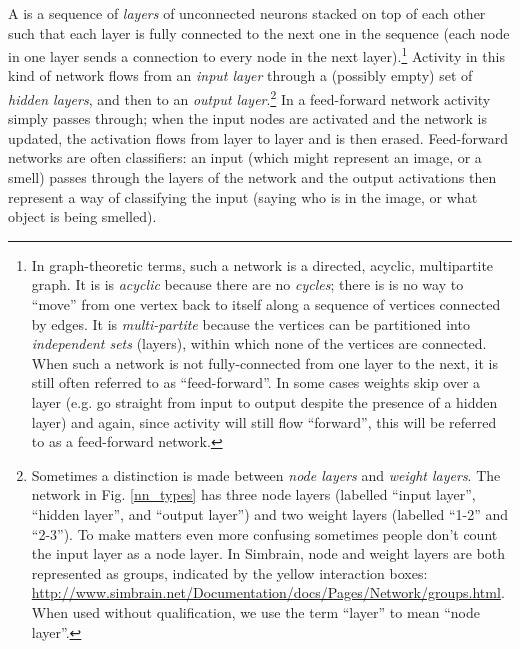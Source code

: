 A   is a sequence of \emph{layers} of unconnected neurons stacked on top of each other such that each layer is fully connected to the next one in the sequence (each node in one layer sends a connection to every node in the next layer).\footnote{\label{acyclic} In graph-theoretic terms, such a network is a directed, acyclic, multipartite graph. It is is \emph{acyclic} because there are no \emph{cycles}; there is is no way to ``move'' from one vertex back to itself along a sequence of vertices connected by edges. It is \emph{multi-partite} because the vertices can be partitioned into \emph{independent sets} (layers), within which none of the vertices are connected. When such a network is not fully-connected from one layer to the next, it is still often referred to as ``feed-forward''. In some cases weights skip over a layer (e.g. go straight from input to output despite the presence of a hidden layer) and again, since activity will still flow ``forward'', this will be referred to as a feed-forward network.}  Activity in this kind of network flows from an \emph{input layer} through a (possibly empty) set of \emph{hidden layers}, and then to an \emph{output layer}.\footnote{Sometimes a distinction is made between \emph{node layers} and \emph{weight layers}. The network in Fig. \ref{nn_types} has three node layers (labelled ``input layer'', ``hidden layer'', and ``output layer'') and two weight layers (labelled ``1-2'' and ``2-3''). To make matters even more confusing sometimes people don't count the input layer as a node layer. In Simbrain, node and weight layers are both represented as groups, indicated by the yellow interaction boxes: \url{http://www.simbrain.net/Documentation/docs/Pages/Network/groups.html}. When used without qualification, we use the term ``layer'' to mean ``node layer''.}   In a feed-forward network activity  simply passes through; when the input nodes are activated and the network is updated, the activation flows from layer to layer and is then erased. Feed-forward networks are often classifiers: an input (which might represent an image, or a smell) passes through the layers of the network and the output activations then represent a way of classifying the input (saying who is in the image, or what object is being smelled).

